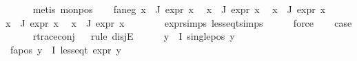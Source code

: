 \begin{isabellebody}
\ \ \ \ \isamarkupfalse%
\ {\isacharparenleft}{\kern0pt}metis\ mon{\isacharunderscore}{\kern0pt}pos{\isacharparenright}{\kern0pt}\isanewline
\ \ \isamarkupfalse%
\ fa{\isacharunderscore}{\kern0pt}neg{\isacharcolon}{\kern0pt}\ {\isachardoublequoteopen}{\isasymforall}x{\isasymin}{\isasymPhi}\ {\isacharbackquote}{\kern0pt}\ J{\isachardot}{\kern0pt}\ expr{\isacharunderscore}{\kern0pt}{}\ x\ {\isasymle}\ {}{\isachardoublequoteclose}\isanewline
{\isachardoublequoteopen}{\isasymforall}x{\isasymin}{\isasymPhi}\ {\isacharbackquote}{\kern0pt}\ J{\isachardot}{\kern0pt}\ expr{\isacharunderscore}{\kern0pt}{}\ x\ {\isasymle}\ {}{\isachardoublequoteclose}\isanewline
{\isachardoublequoteopen}{\isasymforall}x{\isasymin}{\isasymPhi}\ {\isacharbackquote}{\kern0pt}\ J{\isachardot}{\kern0pt}\ expr{\isacharunderscore}{\kern0pt}{}\ x\ {\isasymle}\ {}{\isachardoublequoteclose}\isanewline
{\isachardoublequoteopen}{\isasymforall}x{\isasymin}{\isasymPhi}\ {\isacharbackquote}{\kern0pt}\ J{\isachardot}{\kern0pt}\ expr{\isacharunderscore}{\kern0pt}{}\ x\ {\isasymle}\ {}{\isachardoublequoteclose}\isanewline
{\isachardoublequoteopen}{\isasymforall}x{\isasymin}{\isasymPhi}\ {\isacharbackquote}{\kern0pt}\ J{\isachardot}{\kern0pt}\ expr{\isacharunderscore}{\kern0pt}{}\ x\ {\isasymle}\ {}{\isachardoublequoteclose}\isanewline
\ \ \ \ \isamarkupfalse%
\ expr{\isachardot}{\kern0pt}simps\ less{\isacharunderscore}{\kern0pt}eq{\isacharunderscore}{\kern0pt}t{\isachardot}{\kern0pt}simps\isanewline
\ \ \ \ \isamarkupfalse%
\ force{\isacharplus}{\kern0pt}\isanewline
\ \ \isamarkupfalse%
\ {\isacharquery}{\kern0pt}case\isanewline
\ \ \ \ \isamarkupfalse%
\ r{\isacharunderscore}{\kern0pt}trace{\isacharunderscore}{\kern0pt}conj{\isacharparenleft}{\kern0pt}{}{\isacharparenright}{\kern0pt}\isanewline
\ \ \isamarkupfalse%
{\isacharparenleft}{\kern0pt}rule\ disjE{\isacharparenright}{\kern0pt}\isanewline
\ \ \ \ \isamarkupfalse%
\ {\isachardoublequoteopen}{\isasymforall}y{\isasymin}{\isasymPhi}\ {\isacharbackquote}{\kern0pt}\ I{\isachardot}{\kern0pt}\ single{\isacharunderscore}{\kern0pt}pos\ y{\isachardoublequoteclose}\isanewline
\ \ \ \ \isamarkupfalse%
\ fa{\isacharunderscore}{\kern0pt}pos{\isacharcolon}{\kern0pt}\ {\isachardoublequoteopen}{\isasymforall}y{\isasymin}{\isasymPhi}\ {\isacharbackquote}{\kern0pt}\ I{\isachardot}{\kern0pt}\ less{\isacharunderscore}{\kern0pt}eq{\isacharunderscore}{\kern0pt}t\ {\isacharparenleft}{\kern0pt}expr\ y{\isacharparenright}{\kern0pt}\ {\isacharparenleft}{\kern0pt}{}{\isacharcomma}{\kern0pt}\ {\isasyminfinity}{\isacharcomma}{\kern0pt}\ {}{\isacharcomma}{\kern0pt}\ {}{\isacharcomma}{\kern0pt}\ {}{\isacharcomma}{\kern0pt}\ {}{\isacharparenright}{\kern0pt}{\isachardoublequoteclose}\isanewline

\end{isabellebody}
